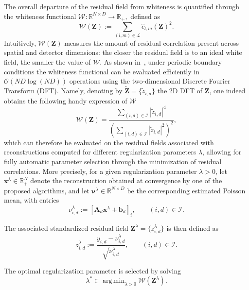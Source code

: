 \documentclass[letterpaper]{article}
\DeclareMathOperator*{\argmin}{arg\,min}
\begin{document}
The overall departure of the residual field from whiteness is quantified through the whiteness functional
$
\mathcal W :
\mathbb R^{N\times D}
\to
\mathbb R_{+},
$
defined as
\begin{equation}
\label{eq:whiteness_def}
\mathcal W(\mathbf Z)
:=
\sum_{(l,m)\in\mathcal L}
\hat c_{l,m}(\mathbf Z)^2.
\end{equation}
Intuitively, $\mathcal W(\mathbf Z)$ measures the amount of residual correlation present across spatial and detector dimensions: the closer the residual field is to an ideal white field, the smaller the value of $\mathcal W$. As shown in~\cite{wp_lanza}, under periodic boundary conditions the whiteness functional can be evaluated efficiently in
$
\mathcal O(ND\log(ND))
$
operations using the two-dimensional Discrete Fourier Transform (DFT). Namely, denoting by
$
\widetilde{\mathbf Z}
=
\{\tilde z_{i,d}\}
$
the 2D DFT of $\mathbf Z$, one indeed obtains the following handy expression of $\mathcal{W}$
\begin{equation}
\label{eq:whiteness_fft}
\mathcal W(\mathbf Z)
=
\frac{
\displaystyle
\sum_{(i,d)\in\mathcal I}
|\tilde z_{i,d}|^4
}{
\left(
\displaystyle
\sum_{(i,d)\in\mathcal I}
|\tilde z_{i,d}|^2
\right)^2
},
\end{equation}
which can therefore be evaluated on the residual fields associated with reconstructions computed for different regularization parameters $\lambda$, allowing for fully automatic parameter selection through the minimization of residual correlations. More precisely, for a given regularization parameter $\lambda > 0$, let
$\mathbf{x}^\lambda \in \mathbb{R}_+^N$
denote the reconstruction obtained at convergence by one of the proposed algorithms, and let
$\boldsymbol{\nu}^\lambda \in \mathbb{R}^{N \times D}$
be the corresponding estimated Poisson mean, with entries
\begin{equation}
    \nu_{i,d}^\lambda
    :=
    \left[
    \mathbf{A}_d \mathbf{x}^\lambda + \mathbf{b}_d
    \right]_i,
    \qquad
    (i,d)\in\mathcal I.
\end{equation}

The associated standardized residual field
$
\mathbf Z^\lambda
=
\{z_{i,d}^\lambda\}
$
is then defined as
\begin{equation}
    z_{i,d}^\lambda
    :=
    \frac{
    y_{i,d}-\nu_{i,d}^\lambda
    }{
    \sqrt{\nu_{i,d}^\lambda}
    },
    \qquad
    (i,d)\in\mathcal I.
\end{equation}

The optimal regularization parameter is selected by solving
\begin{equation}
\label{masked_wp}
    \lambda^*
    \in
    \argmin_{\lambda>0}
    \mathcal W(\mathbf Z^\lambda).
\end{equation}
\end{document}
